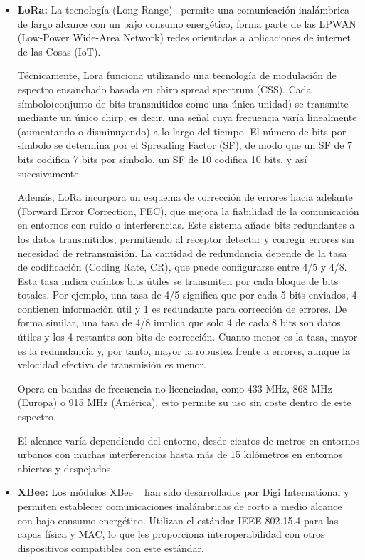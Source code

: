 \begin{itemize}
    \item \textbf{LoRa:} La tecnología (Long Range)~\cite{augustin_lora} permite una comunicación inalámbrica de largo alcance con un bajo consumo energético,
    forma parte de las LPWAN (Low-Power Wide-Area Network) redes orientadas a aplicaciones de internet de las Cosas (IoT).

    Técnicamente, Lora funciona utilizando una tecnología de modulación de espectro ensanchado basada en chirp spread spectrum (CSS).
    Cada símbolo(conjunto de bits transmitidos como una única unidad) se transmite mediante un único chirp, es decir,
    una señal cuya frecuencia varía linealmente (aumentando o disminuyendo) a lo largo del tiempo.
    El número de bits por símbolo se determina por el Spreading Factor (SF), de modo que un SF de 7 bits codifica 7 bits por símbolo,
    un SF de 10 codifica 10 bits, y así sucesivamente.

    Además, LoRa incorpora un esquema de corrección de errores hacia adelante (Forward Error Correction, FEC), que mejora la fiabilidad de la comunicación en entornos con ruido o interferencias.
    Este sistema añade bits redundantes a los datos transmitidos, permitiendo al receptor detectar y corregir errores sin necesidad de retransmisión.
    La cantidad de redundancia depende de la tasa de codificación (Coding Rate, CR), que puede configurarse entre 4/5 y 4/8.
    Esta tasa indica cuántos bits útiles se transmiten por cada bloque de bits totales.
    Por ejemplo, una tasa de 4/5 significa que por cada 5 bits enviados, 4 contienen información útil y 1 es redundante para corrección de errores.
    De forma similar, una tasa de 4/8 implica que solo 4 de cada 8 bits son datos útiles y los 4 restantes son bits de corrección.
    Cuanto menor es la tasa, mayor es la redundancia y, por tanto, mayor la robustez frente a errores, aunque la velocidad efectiva de transmisión es menor.

    Opera en bandas de frecuencia no licenciadas, como 433 MHz, 868 MHz (Europa) o 915 MHz (América),
    esto permite su uso sin coste dentro de este espectro.

    El alcance varía dependiendo del entorno, desde cientos de metros en entornos urbanos con muchas interferencias hasta más de 15 kilómetros en entornos abiertos y despejados.

    \item  \textbf{XBee:} Los módulos XBee ~\cite{digi_xbee_15_4} han sido desarrollados por Digi International y permiten establecer comunicaciones inalámbricas de corto a medio alcance
    con bajo consumo energético.
    Utilizan el estándar IEEE 802.15.4 para las capas física y MAC, lo que les proporciona interoperabilidad con otros dispositivos compatibles con este estándar.


\end{itemize}
